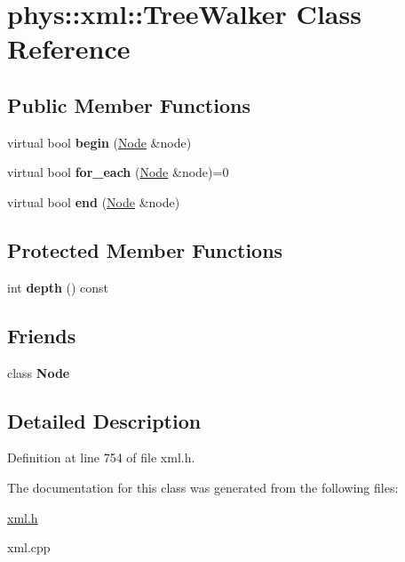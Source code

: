 \hypertarget{classphys_1_1xml_1_1TreeWalker}{
\section{phys::xml::TreeWalker Class Reference}
\label{d5/d8d/classphys_1_1xml_1_1TreeWalker}
}
\subsection*{Public Member Functions}
\begin{DoxyCompactItemize}
\item 
\hypertarget{classphys_1_1xml_1_1TreeWalker_a9f470ce9aa667b78a0281d5f87d09e0e}{
virtual bool {\bfseries begin} (\hyperlink{classphys_1_1xml_1_1Node}{Node} \&node)}
\label{d5/d8d/classphys_1_1xml_1_1TreeWalker_a9f470ce9aa667b78a0281d5f87d09e0e}

\item 
\hypertarget{classphys_1_1xml_1_1TreeWalker_a7fc883fd9b8eeff896c8822cf5b514d3}{
virtual bool {\bfseries for\_\-each} (\hyperlink{classphys_1_1xml_1_1Node}{Node} \&node)=0}
\label{d5/d8d/classphys_1_1xml_1_1TreeWalker_a7fc883fd9b8eeff896c8822cf5b514d3}

\item 
\hypertarget{classphys_1_1xml_1_1TreeWalker_a1486c30615d1de6622f997c28594aeae}{
virtual bool {\bfseries end} (\hyperlink{classphys_1_1xml_1_1Node}{Node} \&node)}
\label{d5/d8d/classphys_1_1xml_1_1TreeWalker_a1486c30615d1de6622f997c28594aeae}

\end{DoxyCompactItemize}
\subsection*{Protected Member Functions}
\begin{DoxyCompactItemize}
\item 
\hypertarget{classphys_1_1xml_1_1TreeWalker_ab2693802beae6312239507a679e2624a}{
int {\bfseries depth} () const }
\label{d5/d8d/classphys_1_1xml_1_1TreeWalker_ab2693802beae6312239507a679e2624a}

\end{DoxyCompactItemize}
\subsection*{Friends}
\begin{DoxyCompactItemize}
\item 
\hypertarget{classphys_1_1xml_1_1TreeWalker_a6db9d28bd448a131448276ee03de1e6d}{
class {\bfseries Node}}
\label{d5/d8d/classphys_1_1xml_1_1TreeWalker_a6db9d28bd448a131448276ee03de1e6d}

\end{DoxyCompactItemize}


\subsection{Detailed Description}


Definition at line 754 of file xml.h.



The documentation for this class was generated from the following files:\begin{DoxyCompactItemize}
\item 
\hyperlink{xml_8h}{xml.h}\item 
xml.cpp\end{DoxyCompactItemize}
